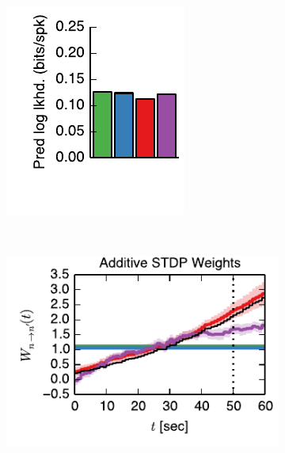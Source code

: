 \begin{figure}[t!]
\begin{subfigure}[T]{1.45in}
    \label{fig:fig3_static_stdp_rule}
  \end{subfigure}
  \begin{subfigure}[T]{1.45in}
    \includegraphics[width=\textwidth]{figures/ch4/fig3_static_pred_ll}    
    \label{fig:fig3_static_pred_ll}
  \end{subfigure} \\
  \vspace{-1.5em}
  \begin{subfigure}[T]{2.4in}
    \flushleft
    \includegraphics[width=\textwidth]{figures/ch4/fig3_add_nothr_trajectory}    

\end{subfigure}
\end{figure}
